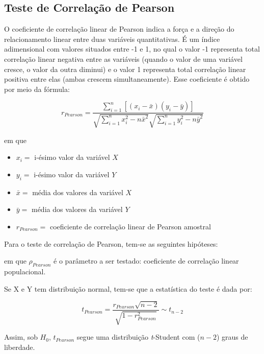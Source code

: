 \documentclass[
]{estat/estat}
\begin{document}
\hypertarget{teste-de-correlauxe7uxe3o-de-pearson}{%
\subsection{Teste de Correlação de
Pearson}\label{teste-de-correlauxe7uxe3o-de-pearson}}

O coeficiente de correlação linear de Pearson indica a força e a direção
do relacionamento linear entre duas variáveis quantitativas. É um índice
adimensional com valores situados entre -1 e 1, no qual o valor -1
representa total correlação linear negativa entre as variáveis (quando o
valor de uma variável cresce, o valor da outra diminui) e o valor 1
representa total correlação linear positiva entre elas (ambas crescem
simultaneamente). Esse coeficiente é obtido por meio da fórmula:

\[r_{Pearson} = \frac{\displaystyle \sum_{i=1}^{n} \left [ \left(x_i-\bar{x}\right) \left(y_i-\bar{y}\right) \right]}{\sqrt{\displaystyle \sum_{i=1}^{n} x_i^2 - n\bar{x}^2} \sqrt{\displaystyle \sum_{i=1}^{n} y_i^2 - n\bar{y}^2}}\]

\noindent em que

\begin{itemize}
\item
  \(x_i=\) i-ésimo valor da variável \(X\)
\item
  \(y_i=\) i-ésimo valor da variável \(Y\)
\item
  \(\bar{x}=\) média dos valores da variável \(X\)
\item
  \(\bar{y}=\) média dos valores da variável \(Y\)
\item
  \(r_{Pearson}=\) coeficiente de correlação linear de Pearson amostral
\end{itemize}

Para o teste de correlação de Pearson, tem-se as seguintes hipóteses:


em que \(\rho_{Pearson}\) é o parâmetro a ser testado: coeficiente de
correlação linear populacional.

Se X e Y tem distribuição normal, tem-se que a estatística do teste é
dada por:

\[t_{Pearson} = \frac{r_{Pearson} \sqrt{n-2}}{\sqrt{1-r_{Pearson}^2}} \sim t_{n-2} \]

Assim, sob \(H_{0}\), \(t_{Pearson}\) segue uma distribuição
\textit{t}-Student com (\(n - 2\)) graus de liberdade.
\end{document}
